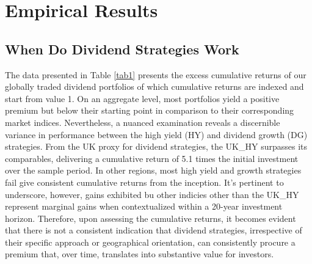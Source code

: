 \documentclass[12pt,preprint, authoryear]{elsarticle}
\numberwithin{equation}{section}
\numberwithin{figure}{section}
\numberwithin{table}{section}
\begin{document}
\newpage

\hypertarget{empirical-results}{%
\section{Empirical Results}\label{empirical-results}}

\hypertarget{when-do-dividend-strategies-work}{%
\subsection{When Do Dividend Strategies
Work}\label{when-do-dividend-strategies-work}}

The data presented in Table \ref{tab1} presents the excess cumulative
returns of our globally traded dividend portfolios of which cumulative
returns are indexed and start from value 1. On an aggregate level, most
portfolios yield a positive premium but below their starting point in
comparison to their corresponding market indices. Nevertheless, a
nuanced examination reveals a discernible variance in performance
between the high yield (HY) and dividend growth (DG) strategies. From
the UK proxy for dividend strategies, the UK\_HY surpasses its
comparables, delivering a cumulative return of 5.1 times the initial
investment over the sample period. In other regions, most high yield and
growth strategies fail give consistent cumulative returns from the
inception. It's pertinent to underscore, however, gains exhibited bu
other indicies other than the UK\_HY represent marginal gains when
contextualized within a 20-year investment horizon. Therefore, upon
assessing the cumulative returns, it becomes evident that there is not a
consistent indication that dividend strategies, irrespective of their
specific approach or geographical orientation, can consistently procure
a premium that, over time, translates into substantive value for
investors.
\end{document}
